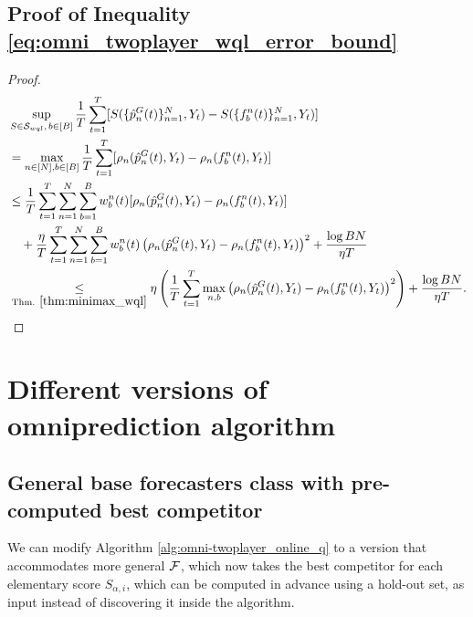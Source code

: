 \subsection{Proof of Inequality \ref{eq:omni_twoplayer_wql_error_bound}} \label{pf:omni_twoplayer_wql_error_bound}
\begin{proof}
  \begin{align*}
    & \sup_{S \in \mathcal{S}_{wql},\, b \in [B]} \frac{1}{T} \sum_{t=1}^T [S(\{\hat{p}^G_n(t)\}_{n=1}^N, Y_t) - S(\{f_b^n(t)\}_{n=1}^N, Y_t)] \\
    & = \max_{n \in [N], b \in [B]} \frac{1}{T} \sum_{t=1}^T [\rho_n(\hat{p}^G_n(t), Y_t) - \rho_n(f_b^n(t), Y_t)] \\
    & \leq \frac{1}{T} \sum_{t=1}^T \sum_{n=1}^N \sum_{b=1}^B w_b^n(t) [\rho_n(\hat{p}^G_n(t), Y_t) - \rho_n(f_b^n(t), Y_t)] \\
    & \quad + \frac{\eta}{T} \sum_{t=1}^T \sum_{n=1}^N \sum_{b=1}^B w_b^n(t) \left(\rho_{n}(\hat{p}^G_n(t), Y_t) - \rho_{n}(f_b^n(t), Y_t)\right)^2 + \frac{\log BN}{\eta T} \\
    & \underset{\text{Thm. } \ref{thm:minimax_wql}}{\leq} \eta \left(\frac{1}{T} \sum_{t=1}^T \max_{n,b} \left(\rho_{n}(\hat{p}^G_n(t), Y_t) - \rho_{n}(f_b^n(t), Y_t)\right)^2\right) + \frac{\log BN}{\eta T}.
  \end{align*}
\end{proof}


\section{Different versions of omniprediction algorithm} \label{appsec:diff_omni_algos}
\subsection{General base forecasters class with pre-computed best competitor}
We can modify Algorithm \ref{alg:omni-twoplayer_online_q} to a version that accommodates more general $\mathcal{F}$, which now takes the best competitor for each elementary score $S_{\alpha, i}$, which can be computed in advance using a hold-out set, as input instead of discovering it inside the algorithm.

